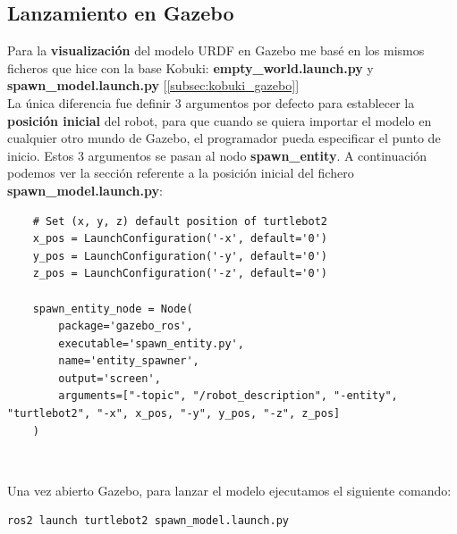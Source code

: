 \subsection{Lanzamiento en Gazebo}
\label{subsec:turtlebot2_gazebo}

Para la \textbf{visualización} del modelo URDF en Gazebo me basé en los mismos ficheros que hice con la base Kobuki: \textbf{empty\_world.launch.py} y \textbf{spawn\_model.launch.py} [\ref{subsec:kobuki_gazebo}]\\

La única diferencia fue definir 3 argumentos por defecto para establecer la \textbf{posición inicial} del robot, para que cuando se quiera importar el modelo en cualquier otro mundo de Gazebo, el programador pueda especificar el punto de inicio. Estos 3 argumentos se pasan al nodo \textbf{spawn\_entity}. A continuación podemos ver la sección referente a la posición inicial del fichero \textbf{spawn\_model.launch.py}:\\
\begin{lstlisting}
	# Set (x, y, z) default position of turtlebot2
	x_pos = LaunchConfiguration('-x', default='0')
	y_pos = LaunchConfiguration('-y', default='0')
	z_pos = LaunchConfiguration('-z', default='0')
	
	spawn_entity_node = Node(
		package='gazebo_ros',
		executable='spawn_entity.py',
		name='entity_spawner',
		output='screen',
		arguments=["-topic", "/robot_description", "-entity", "turtlebot2", "-x", x_pos, "-y", y_pos, "-z", z_pos]
	)
\end{lstlisting}\

Una vez abierto Gazebo, para lanzar el modelo ejecutamos el siguiente comando:\\
\begin{lstlisting}
ros2 launch turtlebot2 spawn_model.launch.py
\end{lstlisting}\

